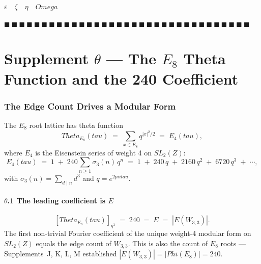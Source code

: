 \documentclass[12pt,a4paper]{article}
\def\mathbb#1{#1}%
\def\mathrm#1{#1}%
\def\Phi#1{Phi#1}%
\def\pi{pi}%
\def\tau{tau}%
\def\Theta{Theta}%
\def\Omega{Omega}%
\theoremstyle{definition}
\newcommand{\ZZ}{\mathbb{Z}}
\begin{document}
\hfill$\varepsilon\quad\zeta\quad\eta\quad\Omega$

\hfill $\blacksquare\ \blacksquare\ \blacksquare\ \blacksquare\ \blacksquare\ \blacksquare\ \blacksquare\ \blacksquare\ \blacksquare\ \blacksquare\ \blacksquare\ \blacksquare\ \blacksquare\ \blacksquare\ \blacksquare\ \blacksquare\ \blacksquare\ \blacksquare\ \blacksquare\ \blacksquare\ \blacksquare\ \blacksquare\ \blacksquare\ \blacksquare\ \blacksquare\ \blacksquare\ \blacksquare\ \blacksquare\ \blacksquare\ \blacksquare\ \blacksquare\ \blacksquare\ \blacksquare$

\clearpage
\part*{\texorpdfstring{Supplement $\theta$ --- The $E_8$ Theta Function and the 240 Coefficient}{Supplement theta --- The E8 Theta Function and the 240 Coefficient}}

\section*{The Edge Count Drives a Modular Form}

The $E_8$ root lattice has theta function
\[
\Theta_{E_8}(\tau) \;=\; \sum_{x\in E_8}q^{|x|^2/2} \;=\; E_4(\tau),
\]
where $E_4$ is the Eisenstein series of weight 4 on $\mathrm{SL}_2(\ZZ)$:
\[
E_4(\tau) \;=\; 1 \;+\; 240\sum_{n\ge 1}\sigma_3(n)\,q^n
\;=\; 1 \;+\; 240\,q \;+\; 2160\,q^2 \;+\; 6720\,q^3 \;+\; \cdots,
\]
with $\sigma_3(n) = \sum_{d\mid n}d^3$ and $q = e^{2\pi i\tau}$.

\subsection*{$\theta$.1 \quad The leading coefficient is $E$}
\[
\boxed{\;[\Theta_{E_8}(\tau)]_{q^1} \;=\; 240 \;=\; E \;=\; |E(W_{3,3})|.\;}
\]
The first non-trivial Fourier coefficient of the unique weight-4 modular
form on $\mathrm{SL}_2(\ZZ)$ equals the edge count of $W_{3,3}$. This is
also the count of $E_8$ roots — Supplements~J, K, L, M established
$|E(W_{3,3})| = |\Phi(E_8)| = 240$.
\end{document}
